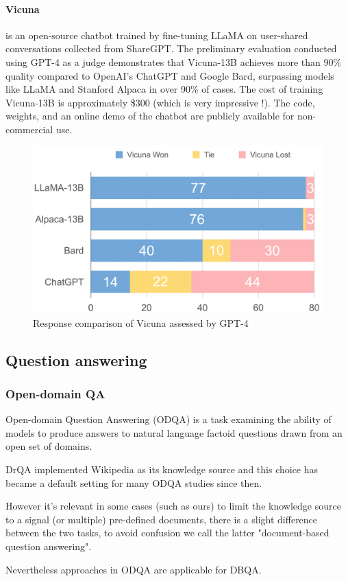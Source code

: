 \documentclass[a4paper,12pt]{article}
\begin{document}
\paragraph*{Vicuna} \cite{vicuna} is an open-source chatbot trained by fine-tuning LLaMA \cite{llama} on user-shared conversations collected from ShareGPT. The preliminary evaluation conducted using GPT-4 as a judge demonstrates that Vicuna-13B achieves more than 90\% 
quality compared to OpenAI's ChatGPT and Google Bard, surpassing models like LLaMA \cite{llama} and Stanford Alpaca \cite{alpaca} in over 90\% of cases. 
The cost of training Vicuna-13B is approximately \$300 (which is very impressive !). The code, weights, and an online demo of the chatbot are publicly available for non-commercial use.

\begin{figure}[htbp]
	\centering
	\includegraphics[width=.5\linewidth]{figures/vicuna.png}
	\caption{Response comparison of Vicuna assessed by GPT-4}
	\label{fig:vicuna}
\end{figure}


\subsection{Question answering}
\subsubsection{Open-domain QA}
Open-domain Question Answering (ODQA) is a
task examining the ability of models to produce answers to natural language factoid questions drawn
from an open set of domains.

DrQA \cite{drqa} implemented Wikipedia as its knowledge source and this choice has became a default setting for many ODQA studies since then.

However it's relevant in some cases (such as ours) to limit the knowledge source to a signal (or multiple) pre-defined documents, there is a slight difference between the two tasks, to avoid confusion we call the latter "document-based question answering". 

Nevertheless approaches in ODQA are applicable for DBQA.
\end{document}
